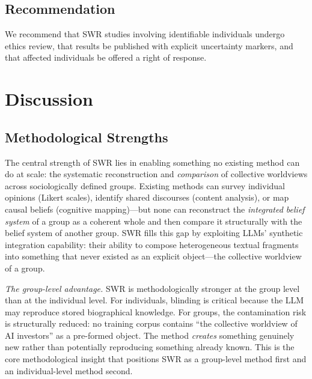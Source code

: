 \documentclass[11pt,a4paper]{article}
\theoremstyle{definition}
\theoremstyle{plain}
\theoremstyle{remark}
\begin{document}
\subsection{Recommendation}

We recommend that SWR studies involving identifiable individuals undergo ethics review, that results be published with explicit uncertainty markers, and that affected individuals be offered a right of response.



\section{Discussion}
\label{sec:discussion}

\subsection{Methodological Strengths}

The central strength of SWR lies in enabling something no existing method can do at scale: the systematic reconstruction and \emph{comparison} of collective worldviews across sociologically defined groups. Existing methods can survey individual opinions (Likert scales), identify shared discourses (content analysis), or map causal beliefs (cognitive mapping)---but none can reconstruct the \emph{integrated belief system} of a group as a coherent whole and then compare it structurally with the belief system of another group. SWR fills this gap by exploiting LLMs' synthetic integration capability: their ability to compose heterogeneous textual fragments into something that never existed as an explicit object---the collective worldview of a group.

\emph{The group-level advantage.} SWR is methodologically stronger at the group level than at the individual level. For individuals, blinding is critical because the LLM may reproduce stored biographical knowledge. For groups, the contamination risk is structurally reduced: no training corpus contains ``the collective worldview of AI investors'' as a pre-formed object. The method \emph{creates} something genuinely new rather than potentially reproducing something already known. This is the core methodological insight that positions SWR as a group-level method first and an individual-level method second.
\end{document}
